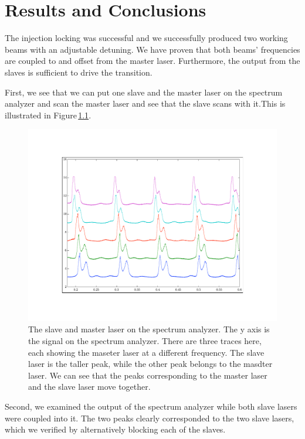 \chapter{Results and Conclusions}\label{triumphantDataChapter}

The injection locking was successful and we successfully produced two working beams with an adjustable detuning. We have proven that both beams' frequencies are coupled to and offset from the master laser. Furthermore, the output from the slaves is sufficient to drive the transition. 

First, we see that we can put one slave and the master laser on the spectrum analyzer and scan the master laser and see that the slave scans with it.This is illustrated in Figure\,\ref{fig:slaveMaster}.

\begin{figure}
    \centerline{\includegraphics{sampleOffsetData}}
    \caption[]{\label{fig:slaveMaster}
    The slave and master laser on the spectrum analyzer. The y axis is the signal on the spectrum analyzer. There are three traces here, each showing the maseter laser at a different frequency. The slave laser is the taller peak, while the other peak belongs to the masdter laser. We can see that the peaks corresponding to the master laser and the slave laser move together.}
\end{figure}

Second, we examined the output of the spectrum analyzer while both slave lasers were coupled into it. 
The two peaks clearly corresponded to the two slave lasers, which we verified by alternatively blocking each of the slaves. 

